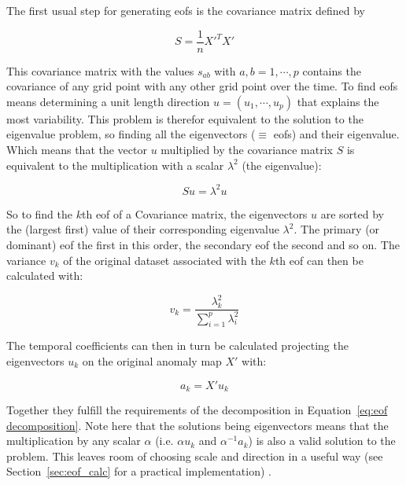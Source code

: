 The first usual step for generating \acp{eof} is the covariance matrix defined by 

\begin{equation}
  S = \frac{1}{n} X'^T X' 
  \label{eq:covariance map}
\end{equation}

This covariance matrix with the values $s_{ab}$ with $a,b = 1, \cdots, p$ contains the covariance of any grid point with any other grid point over the time. 
To find \acp{eof} means determining a unit length direction $u = (u_1, \cdots, u_p)$ that explains the most variability. 
This problem is therefor equivalent to the solution to the eigenvalue problem, so finding all the eigenvectors ($\equiv$ \acp{eof}) and their eigenvalue. Which means that the vector $u$ multiplied by the covariance matrix $S$ is equivalent to the multiplication with a scalar $\lambda^2$ (the eigenvalue):  

\begin{equation}
  Su = \lambda^2 u
  \label{eq:eigenvalue problem} 
\end{equation}

So to find the $k$th \ac{eof} of a Covariance matrix, the eigenvectors $u$ are sorted by the (largest first) value of their corresponding eigenvalue $\lambda^2$. 
The primary (or dominant) \ac{eof} the first in this order, the secondary \ac{eof} the second and so on. 
The variance $v_k$ of the original dataset associated with the $k$th \ac{eof} can then be calculated with: 

\begin{equation}
  v_k = \frac{\lambda^2_k}{\sum^{p}_{i=1} \lambda^2_i}
  \label{eq:eof variance calculation}
\end{equation}

The temporal coefficients can then in turn be calculated projecting the eigenvectors $u_k$ on the original anomaly map $X'$ with: 

\begin{equation}
  a_{k} = X'u_k
\end{equation}

Together they fulfill the requirements of the decomposition in Equation~\ref{eq:eof decomposition}. 
Note here that the solutions being eigenvectors means that the multiplication by any scalar $\alpha$ (i.e. $\alpha u_k$ and $\alpha^{-1} a_k$) is also a valid solution to the problem. 
This leaves room of choosing scale and direction in a useful way (see Section~\ref{sec:eof_calc} for a practical implementation) \cite{vietinghoffdiss}. 

